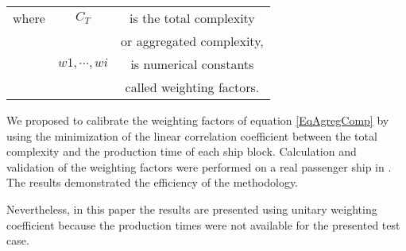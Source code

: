 \begin{tabular}{ l c c }
    where   & $C_T$ & is the total complexity\\
            &       & or aggregated complexity,\\
            & $w1, \cdots , wi$	& is numerical constants\\
            &  	&  called weighting factors.
\end{tabular}

We proposed to calibrate the weighting factors of equation \ref{EqAgregComp} by using the minimization of the linear correlation coefficient between the total complexity and the production time of each ship block. Calculation and validation of the weighting factors were performed on a real passenger ship in \cite{CapraceCAD12}. The results demonstrated the efficiency of the methodology.

Nevertheless, in this paper the results are presented using unitary weighting coefficient because the production times were not available for the presented test case.

